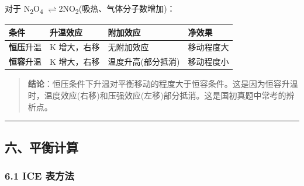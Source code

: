 \documentclass[a4paper,11pt]{ctexart}
\newcounter{none}
\newcommand{\箭}{\ensuremath{\rightarrow}}
\newcommand{\左箭}{\ensuremath{\leftarrow}}
\newcommand{\上箭}{\ensuremath{\uparrow}}
\newcommand{\下箭}{\ensuremath{\downarrow}}
\newcommand{\衡}{\ensuremath{\rightleftharpoons}}
\newcommand{\双箭}{\ensuremath{\leftrightarrow}}
\newcommand{\约等于}{\ensuremath{\approx}}
\newcommand{\小于等于}{\ensuremath{\leq}}
\newcommand{\大于等于}{\ensuremath{\geq}}
\newcommand{\不等于}{\ensuremath{\neq}}
\newcommand{\西格马}{\ensuremath{\sigma}}
\newcommand{\派}{\ensuremath{\pi}}
\begin{document}
对于 N\textsubscript{2}O\textsubscript{4} \衡 2NO\textsubscript{2}(吸热、气体分子数增加)：

{\def\LTcaptype{none} %
\begin{longtable}[]{@{}
  >{\raggedright\arraybackslash}p{}
  >{\raggedright\arraybackslash}p{}
  >{\raggedright\arraybackslash}p{}
  >{\raggedright\arraybackslash}p{}@{}}
\toprule\noalign{}
\begin{minipage}[b]{\linewidth}\raggedright
条件
\end{minipage} & \begin{minipage}[b]{\linewidth}\raggedright
升温效应
\end{minipage} & \begin{minipage}[b]{\linewidth}\raggedright
附加效应
\end{minipage} & \begin{minipage}[b]{\linewidth}\raggedright
净效果
\end{minipage} \\
\midrule\noalign{}
\endhead
\bottomrule\noalign{}
\endlastfoot
\textbf{恒压}升温 & K 增大，右移 & 无附加效应 & 移动程度大 \\
\textbf{恒容}升温 & K 增大，右移 & 温度升高(部分抵消) & 移动程度小 \\
\end{longtable}
}

\begin{quote}
\textbf{结论}：恒压条件下升温对平衡移动的程度大于恒容条件。这是因为恒容升温时，温度效应(右移)和压强效应(左移)部分抵消。这是国初真题中常考的辨析点。
\end{quote}

\begin{center}\rule{0.5\linewidth}{0.5pt}\end{center}

\subsection{六、平衡计算}\label{ux516dux5e73ux8861ux8ba1ux7b97}

\subsubsection{6.1 ICE 表方法}\label{ice-ux8868ux65b9ux6cd5}
\end{document}
